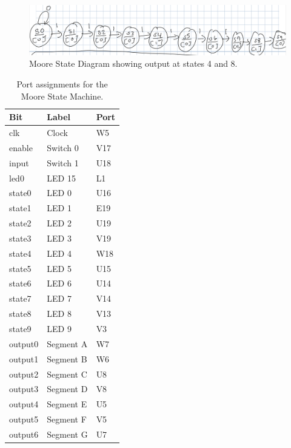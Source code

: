 \documentclass[11pt]{article}
\begin{document}
\begin{center}
\begin{figure}
	\includegraphics[width=\textwidth]{images/img1.png}
	\caption{\label{fig:moore_state_diagram}Moore State Diagram showing output at states 4 and 8.}
\end{figure}
\end{center}

\begin{table}[H]
\begin{center}
\begin{tabular}{| l | l | l |}
	\hline
	Bit & Label & Port \\ \hline
	clk & Clock & W5 \\ \hline
	enable & Switch 0 & V17 \\ \hline
	input & Switch 1 & U18 \\ \hline
	led0 & LED 15 & L1 \\ \hline
	state0 & LED 0 & U16 \\ \hline
	state1 & LED 1 & E19 \\ \hline
	state2 & LED 2 & U19 \\ \hline
	state3 & LED 3 & V19 \\ \hline
	state4 & LED 4 & W18 \\ \hline
	state5 & LED 5 & U15 \\ \hline
	state6 & LED 6 & U14 \\ \hline
	state7 & LED 7 & V14 \\ \hline
	state8 & LED 8 & V13 \\ \hline
	state9 & LED 9 & V3 \\ \hline
	output0 & Segment A & W7 \\ \hline
	output1 & Segment B & W6 \\ \hline
	output2 & Segment C & U8 \\ \hline
	output3 & Segment D & V8 \\ \hline
	output4 & Segment E & U5 \\ \hline
	output5 & Segment F & V5 \\ \hline
	output6 & Segment G & U7 \\ \hline
\end{tabular}
\caption{\label{tab:moore_state_ports}Port assignments for the Moore State Machine.}
\end{center}
\end{table}
\end{document}
